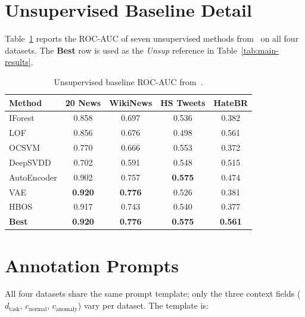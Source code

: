 \documentclass[12pt]{article}
\begin{document}
\appendix
\section{Unsupervised Baseline Detail}
\label{app:unsup-detail}

Table~\ref{tab:unsup-full} reports the ROC-AUC of seven unsupervised methods
from~\cite{stil} on all four datasets. The \textbf{Best} row is used as the
\textit{Unsup} reference in Table~\ref{tab:main-results}.

\renewcommand{\arraystretch}{0.9}
\begin{table}[ht]
\small
\centering
\caption{Unsupervised baseline ROC-AUC from~\cite{stil}.}
\label{tab:unsup-full}
\begin{tabular}{lcccc}
\toprule
\textbf{Method} & \textbf{20 News} & \textbf{WikiNews} & \textbf{HS Tweets} & \textbf{HateBR} \\
\midrule
IForest          & 0.858 & 0.697 & 0.536 & 0.382 \\
LOF              & 0.856 & 0.676 & 0.498 & 0.561 \\
OCSVM            & 0.770 & 0.666 & 0.553 & 0.372 \\
DeepSVDD         & 0.702 & 0.591 & 0.548 & 0.515 \\
AutoEncoder      & 0.902 & 0.757 & \textbf{0.575} & 0.474 \\
VAE              & \textbf{0.920} & \textbf{0.776} & 0.526 & 0.381 \\
HBOS             & 0.917 & 0.743 & 0.540 & 0.377 \\
\midrule
\textbf{Best}    & \textbf{0.920} & \textbf{0.776} & \textbf{0.575} & \textbf{0.561} \\
\bottomrule
\end{tabular}
\end{table}

\section{Annotation Prompts}
\label{app:prompts}

All four datasets share the same prompt template; only the three context
fields ($d_{\text{task}}$, $c_{\text{normal}}$, $c_{\text{anomaly}}$) vary
per dataset. The template is:
\end{document}

